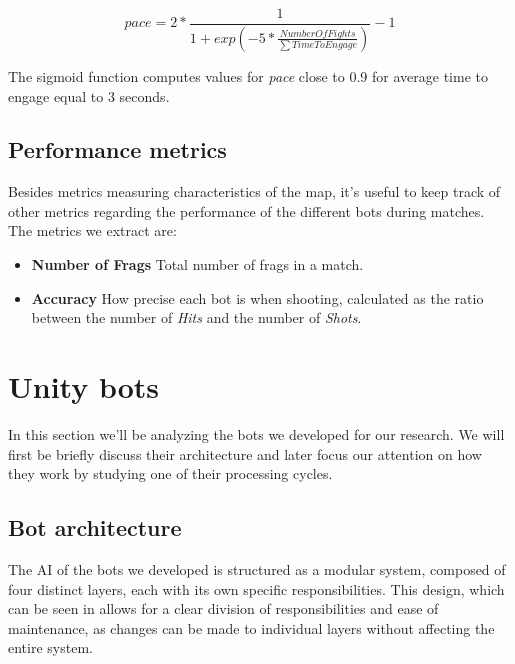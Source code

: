 \begin{equation}
pace = 2 * \frac{1}{1 + exp \left( -5 * \frac{NumberOfFights}{\sum TimeToEngage} \right) } - 1
\label{eq:pace}
\end{equation}

The sigmoid function  computes values for \textit{pace} close to 0.9 for average time to engage equal to 3 seconds. %


\subsection{Performance metrics}
Besides metrics measuring characteristics of the map, it's useful to keep track of other metrics regarding the performance of the different bots during matches.
The metrics we extract are:
\begin{itemize}
\item \textbf{Number of Frags} Total number of frags in a match.
\item \textbf{Accuracy} How precise each bot is when shooting, calculated as the ratio between the number of \textit{Hits} and the number of \textit{Shots}.
\end{itemize}



\section{Unity bots} \label{section:unity_bots}
In this section we'll be analyzing the bots we developed for our research. We will first be briefly discuss their architecture and later focus our attention on how they work by studying one of their processing cycles. 

\subsection{Bot architecture}
The AI of the bots we developed is structured as a modular system, composed of four distinct layers, each with its own specific responsibilities. This design, which can be seen in  allows for a clear division of responsibilities and ease of maintenance, as changes can be made to individual layers without affecting the entire system.

